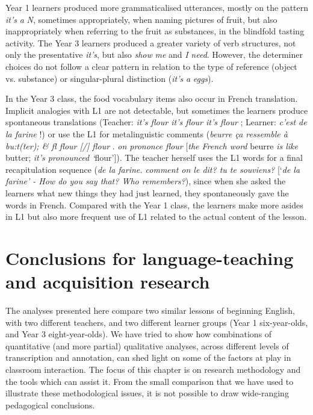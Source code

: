 \documentclass[output=paper,colorlinks,citecolor=brown,modfonts,nonflat]{../langscibook}
\begin{document}
Year 1 learners produced more grammaticalised utterances, mostly on the pattern \textit{it’s} \textit{a} \textit{N}, sometimes appropriately, when naming pictures of fruit, but also inappropriately when referring to the fruit as substances, in the blindfold tasting activity. The Year 3 learners produced a greater variety of verb structures, not only the presentative \textit{it’s}, but also \textit{show} \textit{me} and \textit{I} \textit{need}. However, the determiner choices do not follow a clear pattern in relation to the type of reference (object vs. substance) or singular-plural distinction (\textit{it’s} \textit{a} \textit{eggs}). 

In the Year 3 class, the food vocabulary items also occur in French translation. Implicit analogies with L1 are not detectable, but sometimes the learners produce spontaneous translations (Teacher: \textit{it’s flour it’s flour it’s flour} ; Learner: \textit{c’est de la farine} !) or use the L1 for metalinguistic comments (\textit{beurre ça ressemble à bu:t(ter); \& fl flour [/] flour} . \textit{on prononce flour} [\textit{the French word} beurre \textit{is like} butter; \textit{it’s pronounced ‘}flour’]). The teacher herself uses the L1 words for a final recapitulation sequence (\textit{de la farine. comment on le dit? tu te souviens?} [‘\textit{de la farine’ - How do you say that? Who remembers?}), since when she asked the learners what new things they had just learned, they spontaneously gave the words in French. Compared with the Year 1 class, the learners make more asides in L1 but also more frequent use of L1 related to the actual content of the lesson.

\section{Conclusions for language-teaching and acquisition research}

The analyses presented here compare two similar lessons of beginning English, with two different teachers, and two different learner groups (Year 1 six-year-olds, and Year 3 eight-year-olds). We have tried to show how combinations of quantitative (and more partial) qualitative analyses, across different levels of transcription and annotation, can shed light on some of the factors at play in classroom interaction. The focus of this chapter is on research methodology and the tools which can assist it. From the small comparison that we have used to illustrate these methodological issues, it is not possible to draw wide-ranging pedagogical conclusions. 
\end{document}
